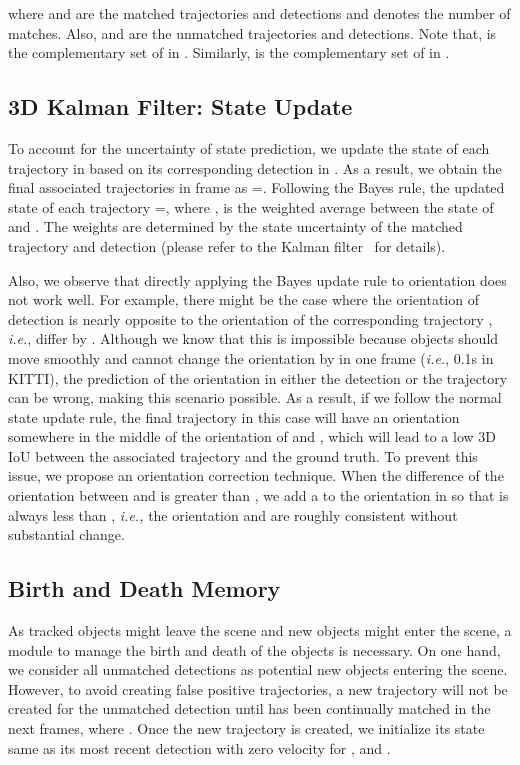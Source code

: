 \documentclass[letterpaper, 10 pt, conference]{ieeeconf}
\begin{document}
where  and  are the matched trajectories and detections and  denotes the number of matches. Also,  and  are the unmatched trajectories and detections. Note that,  is the complementary set of  in . Similarly,  is the complementary set of  in .

\subsection{3D Kalman Filter: State Update}\label{sec:update}

To account for the uncertainty of state prediction, we update the state of each trajectory in  based on its corresponding detection in . As a result, we obtain the final associated trajectories in frame  as =. Following the Bayes rule, the updated state of each trajectory =, where   , is the weighted average between the state of  and . The weights are determined by the state uncertainty of the matched trajectory  and detection  (please refer to the Kalman filter~\cite{Kalman1960} for details).

Also, we observe that directly applying the Bayes update rule to orientation  does not work well. For example, there might be the case where the orientation of detection  is nearly opposite to the orientation of the corresponding trajectory , \emph{i.e.}, differ by . Although we know that this is impossible because objects should move smoothly and cannot change the orientation by  in one frame (\emph{i.e.}, 0.1s in KITTI), the prediction of the orientation in either the detection or the trajectory can be wrong, making this scenario possible. As a result, if we follow the normal state update rule, the final trajectory  in this case will have an orientation somewhere in the middle of the orientation of  and , which will lead to a low 3D IoU between the associated trajectory and the ground truth. To prevent this issue, we propose an orientation correction technique. When the difference of the orientation  between  and  is greater than , we add a  to the orientation in  so that  is always less than , \emph{i.e.,} the orientation  and  are roughly consistent without substantial change. 

\vspace{-0.1cm}
\subsection{Birth and Death Memory}

As tracked objects might leave the scene and new objects might enter the scene, a module to manage the birth and death of the objects is necessary. On one hand, we consider all unmatched detections  as potential new objects entering the scene. However, to avoid creating false positive trajectories, a new trajectory  will not be created for the unmatched detection  until  has been continually matched in the next  frames, where . Once the new trajectory  is created, we initialize its state same as its most recent detection  with zero velocity for ,  and . 
\end{document}
